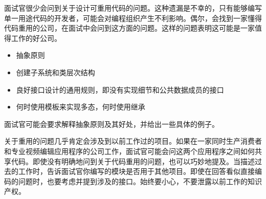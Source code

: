 
面试官很少会问到关于设计可重用代码的问题。这种遗漏是不幸的，只有能够编写单一用途代码的开发者，可能会对编程组织产生不利影响。偶尔，会找到一家懂得代码重用的公司，在面试中会问到这方面的问题。这样的问题表明这可能是一家值得工作的好公司。


\begin{itemize}
\item
抽象原则

\item
创建子系统和类层次结构

\item
良好接口设计的通用规则，即没有实现细节和公共数据成员的接口

\item
何时使用模板来实现多态，何时使用继承
\end{itemize}


面试官可能会要求解释抽象原则及其好处，并给出一些具体的例子。

关于重用的问题几乎肯定会涉及到以前工作过的项目。如果在一家同时生产消费者和专业视频编辑应用程序的公司工作，面试官可能会问这两个应用程序之间如何共享代码。即使没有明确地问到关于代码重用的问题，也可以巧妙地提及。当描述过去的工作时，告诉面试官你编写的模块是否用于其他项目。即使在回答看似直接编码的问题时，也要考虑并提到涉及的接口。始终要小心，不要泄露以前工作的知识产权。
















